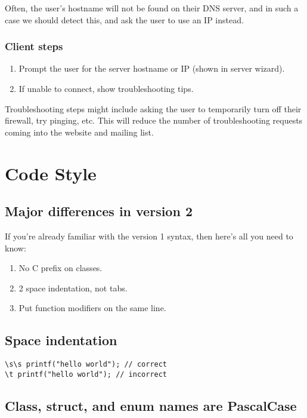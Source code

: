 \documentclass{article}
\begin{document}
Often, the user's hostname will not be found on their DNS server, and in such
a case we should detect this, and ask the user to use an IP instead.

\subsubsection{Client steps}
\begin{enumerate}
  \item Prompt the user for the server hostname or IP (shown in server wizard).
  \item If unable to connect, show troubleshooting tips.
\end{enumerate}

Troubleshooting steps might include asking the user to temporarily turn off
their firewall, try pinging, etc. This will reduce the number of troubleshooting
requests coming into the website and mailing list.

\appendix
\section{Code Style}

\subsection{Major differences in version 2}

If you're already familiar with the version 1 syntax, then here's all you need
to know:

\begin{enumerate}
  \item No C prefix on classes.
  \item 2 space indentation, not tabs.
  \item Put function modifiers on the same line.
\end{enumerate}

\subsection{Space indentation}

\begin{verbatim}
\s\s printf("hello world"); // correct
\t printf("hello world"); // incorrect
\end{verbatim}

\subsection{Class, struct, and enum names are PascalCase}
\end{document}
